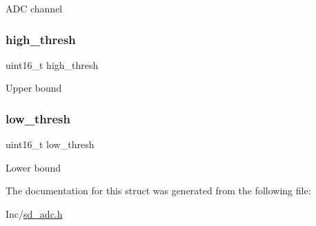 A\+DC channel \mbox{\label{structsd__adc__chan_a2de25c524e91cef9584ffc432e4a506e}} 
\subsubsection{\texorpdfstring{high\+\_\+thresh}{high\_thresh}}
{\footnotesize\ttfamily uint16\+\_\+t high\+\_\+thresh}

Upper bound \mbox{\label{structsd__adc__chan_ac99d3c3bccb8932626335a00ec5e325f}} 
\subsubsection{\texorpdfstring{low\+\_\+thresh}{low\_thresh}}
{\footnotesize\ttfamily uint16\+\_\+t low\+\_\+thresh}

Lower bound 

The documentation for this struct was generated from the following file\+:\begin{DoxyCompactItemize}
\item 
Inc/\mbox{\hyperlink{sd__adc_8h}{sd\+\_\+adc.\+h}}\end{DoxyCompactItemize}
